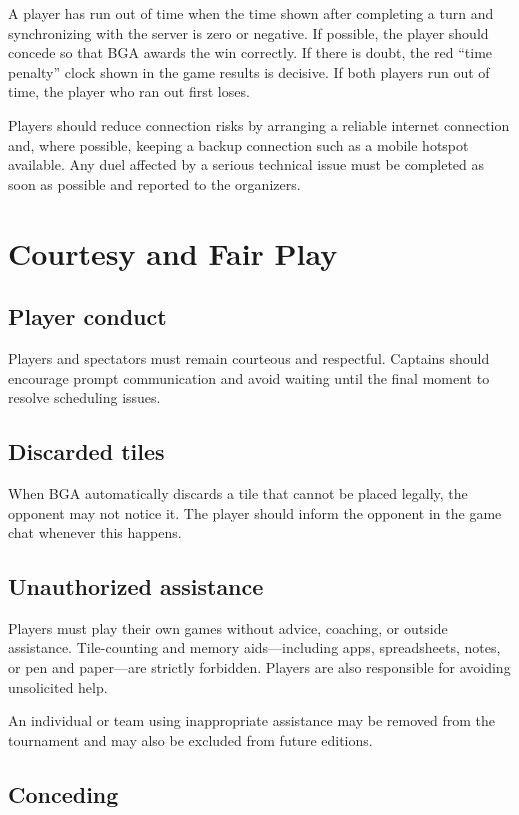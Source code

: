 \documentclass[10pt,a4paper]{article}
\begin{document}
A player has run out of time when the time shown after completing a turn and
synchronizing with the server is zero or negative. If possible, the player
should concede so that BGA awards the win correctly. If there is doubt, the red
``time penalty'' clock shown in the game results is decisive. If both players
run out of time, the player who ran out first loses.

Players should reduce connection risks by arranging a reliable internet
connection and, where possible, keeping a backup connection such as a mobile
hotspot available. Any duel affected by a serious technical issue must be
completed as soon as possible and reported to the organizers.

\section{Courtesy and Fair Play}

\subsection{Player conduct}

Players and spectators must remain courteous and respectful. Captains should
encourage prompt communication and avoid waiting until the final moment to
resolve scheduling issues.

\subsection{Discarded tiles}

When BGA automatically discards a tile that cannot be placed legally, the
opponent may not notice it. The player should inform the opponent in the game
chat whenever this happens.

\subsection{Unauthorized assistance}

Players must play their own games without advice, coaching, or outside
assistance. Tile-counting and memory aids---including apps, spreadsheets, notes,
or pen and paper---are strictly forbidden. Players are also responsible for
avoiding unsolicited help.

An individual or team using inappropriate assistance may be removed from the
tournament and may also be excluded from future editions.

\subsection{Conceding}
\end{document}
